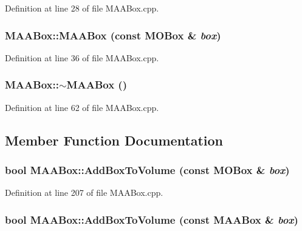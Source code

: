 Definition at line 28 of file MAABox.cpp.\hypertarget{class_m_a_a_box_7e94c069bfb8537ff9410b8a2b7f89a5}{
\subsubsection[{MAABox}]{\setlength{\rightskip}{0pt plus 5cm}MAABox::MAABox (const {\bf MOBox} \& {\em box})}}
\label{class_m_a_a_box_7e94c069bfb8537ff9410b8a2b7f89a5}




Definition at line 36 of file MAABox.cpp.\hypertarget{class_m_a_a_box_263ea425cafadae722c43cdfc9160274}{
\subsubsection[{$\sim$MAABox}]{\setlength{\rightskip}{0pt plus 5cm}MAABox::$\sim$MAABox ()}}
\label{class_m_a_a_box_263ea425cafadae722c43cdfc9160274}




Definition at line 62 of file MAABox.cpp.

\subsection{Member Function Documentation}
\hypertarget{class_m_a_a_box_b5d6ad41455f8a7c76b41ef305cce52f}{
\subsubsection[{AddBoxToVolume}]{\setlength{\rightskip}{0pt plus 5cm}bool MAABox::AddBoxToVolume (const {\bf MOBox} \& {\em box})}}
\label{class_m_a_a_box_b5d6ad41455f8a7c76b41ef305cce52f}




Definition at line 207 of file MAABox.cpp.\hypertarget{class_m_a_a_box_7da828ab9a51859fb07aedfce50967f0}{
\subsubsection[{AddBoxToVolume}]{\setlength{\rightskip}{0pt plus 5cm}bool MAABox::AddBoxToVolume (const {\bf MAABox} \& {\em box})}}
\label{class_m_a_a_box_7da828ab9a51859fb07aedfce50967f0}




